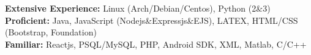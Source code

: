 

\begin{cvparagraph}

  \textbf{Extensive Experience:} Linux (Arch/Debian/Centos), Python (2\&3)\\
  \textbf{Proficient:} Java, JavaScript (Nodejs\&Expressjs\&EJS), LATEX, HTML/CSS (Bootstrap, Foundation)\\
  \textbf{Familiar:} Reactjs, PSQL/MySQL, PHP, Android SDK, XML, Matlab, C/C++
\end{cvparagraph}
